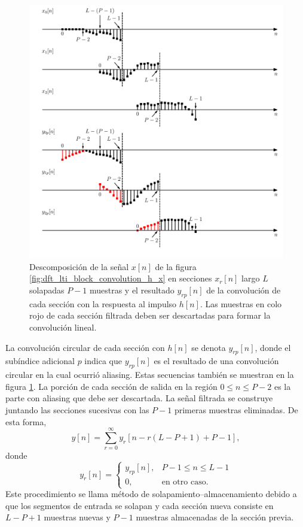 \documentclass[a4paper]{report}
\begin{document}
\begin{figure}[!htb]
 \begin{center}
 \includegraphics[width=1\textwidth]{figuras/dft_lti_block_convolution_overlap_save.pdf}
 \caption{\label{fig:dft_lti_block_convolution_overlap_save} Descomposición de la señal \(x[n]\) de la figura \ref{fig:dft_lti_block_convolution_h_x} en secciones \(x_r[n]\) largo \(L\) solapadas \(P-1\) muestras y el resultado \(y_{rp}[n]\) de la convolución de cada sección con la respuesta al impulso \(h[n]\). Las muestras en colo rojo de cada sección filtrada deben ser descartadas para formar la convolución lineal.}
 \end{center}
\end{figure}

La convolución circular de cada sección con \(h[n]\) se denota \(y_{rp}[n]\), donde el subíndice adicional \(p\) indica que \(y_{rp}[n]\) es el resultado de una convolución circular en la cual ocurrió aliasing. Estas secuencias también se muestran en la figura \ref{fig:dft_lti_block_convolution_overlap_save}. La porción de cada sección de salida en la región \(0\leq n\leq P-2\) es la parte con aliasing que debe ser descartada. La señal filtrada se construye juntando las secciones sucesivas con las \(P-1\) primeras muestras eliminadas. De esta forma,
\[
 y[n]=\sum_{r=0}^\infty y_r[n-r(L-P+1)+P-1],
\]
donde 
\[
 y_r[n]=
 \left\{ 
 \begin{array}{ll}
  y_{rp}[n], & P-1\leq n\leq L-1\\
  0, & \textrm{en otro caso.}
 \end{array}
 \right.
\]
Este procedimiento se llama método de solapamiento--almacenamiento debido a que los segmentos de entrada se solapan y cada sección nueva consiste en \(L-P+1\) muestras nuevas y \(P-1\) muestras almacenadas de la sección previa.  
\end{document}

